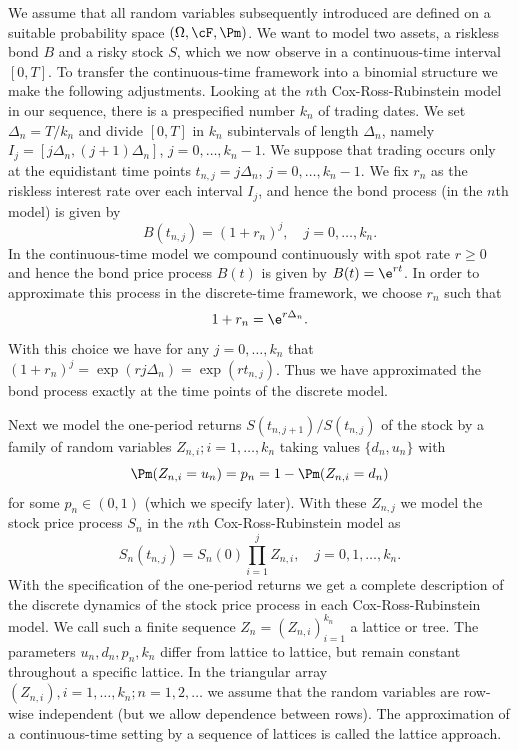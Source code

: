 We assume that all random variables subsequently introduced are defined on a suitable probability space \((\Omega, \cF, \Pm)\). We want to model two assets, a riskless bond \(B\) and a risky stock \(S\), which we now observe in a continuous-time interval \([0, T]\). To transfer the continuous-time framework into a binomial structure we make the following adjustments. Looking at the \(n\)th Cox-Ross-Rubinstein model in our sequence, there is a prespecified number \(k_n\) of trading dates. We set \(\Delta_n = T/k_n\) and divide \([0, T]\) in \(k_n\) subintervals of length \(\Delta_n\), namely \(I_j = [j\Delta_n, (j+1)\Delta_n]\), \(j=0, \dots, k_n - 1\). We suppose that trading occurs only at the equidistant time points \(t_{n,j} = j\Delta_n\), \(j=0, \dots, k_n - 1\). We fix \(r_n\) as the riskless interest rate over each interval \(I_j\), and hence the bond process (in the \(n\)th model) is given by
\[
	B(t_{n,j}) = (1+r_n)^j, \quad j=0, \dots, k_n.
\]
In the continuous-time model we compound continuously with spot rate \(r \geq 0\) and hence the bond price process \(B(t)\) is given by \(B(t) = \e^{rt}\). In order to approximate this process in the discrete-time framework, we choose \(r_n\) such that
\begin{equation} \label{eq:RateApproximation}
	1 + r_n = \e^{r\Delta_n}.
\end{equation}
With this choice we have for any \(j=0, \dots, k_n\) that \((1+r_n)^j = \exp(rj\Delta_n) = \exp(rt_{n,j})\). Thus we have approximated the bond process exactly at the time points of the discrete model.

Next we model the one-period returns \(S(t_{n,j+1})/S(t_{n,j})\) of the stock by a family of random variables \(Z_{n,i}; i=1, \dots, k_n\) taking values \(\{d_n, u_n\}\) with
\[
	\Pm(Z_{n,i} = u_n) = p_n = 1 - \Pm(Z_{n,i} = d_n)
\]
for some \(p_n \in (0, 1)\) (which we specify later). With these \(Z_{n,j}\) we model the stock price process \(S_n\) in the \(n\)th Cox-Ross-Rubinstein model as
\[
	S_n(t_{n,j}) = S_n(0) \prod_{i=1}^j Z_{n,i}, \quad j=0, 1, \dots, k_n.
\]
With the specification of the one-period returns we get a complete description of the discrete dynamics of the stock price process in each Cox-Ross-Rubinstein model. We call such a finite sequence \(Z_n = (Z_{n,i})_{i=1}^{k_n}\) a lattice or tree. The parameters \(u_n, d_n, p_n, k_n\) differ from lattice to lattice, but remain constant throughout a specific lattice. In the triangular array \((Z_{n,i}), i=1, \dots, k_n; n=1, 2, \dots\) we assume that the random variables are row-wise independent (but we allow dependence between rows). The approximation of a continuous-time setting by a sequence of lattices is called the lattice approach.

